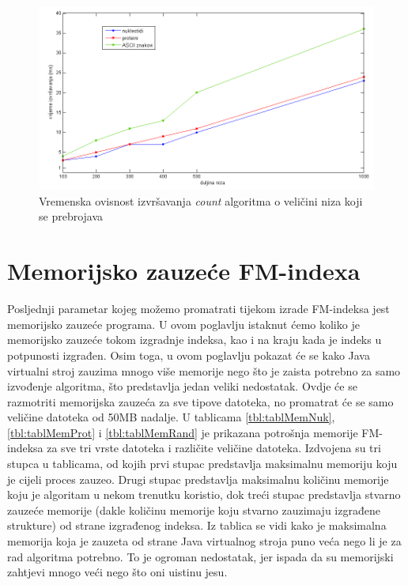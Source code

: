 \begin{figure}[H]
   \centering
       \includegraphics[width=\textwidth]{./pictures/test_count.png}
 \caption{Vremenska ovisnost izvršavanja \emph{count} algoritma o veličini niza koji se prebrojava}
 \label{fig:test_count}
\end{figure}


\section{Memorijsko zauzeće FM-indexa}

Posljednji parametar kojeg možemo promatrati tijekom izrade FM-indeksa jest memorijsko zauzeće programa. U ovom poglavlju istaknut ćemo koliko je memorijsko zauzeće tokom izgradnje indeksa, kao i na kraju kada je indeks u potpunosti izgrađen. Osim toga, u ovom poglavlju pokazat će se kako Java virtualni stroj zauzima mnogo više memorije nego što je zaista potrebno za samo izvođenje algoritma, što predstavlja jedan veliki nedostatak. Ovdje će se razmotriti memorijska zauzeća za sve tipove datoteka, no promatrat će se samo veličine datoteka od 50MB nadalje. U tablicama \ref{tbl:tablMemNuk}, \ref{tbl:tablMemProt} i \ref{tbl:tablMemRand} je prikazana potrošnja memorije FM-indeksa za sve tri vrste datoteka i različite veličine datoteka. Izdvojena su tri stupca u tablicama, od kojih prvi stupac predstavlja maksimalnu memoriju koju je cijeli proces zauzeo. Drugi stupac predstavlja maksimalnu količinu memorije koju je algoritam u nekom trenutku koristio, dok treći stupac predstavlja stvarno zauzeće memorije (dakle količinu memorije koju stvarno zauzimaju izgrađene strukture) od strane izgrađenog indeksa. Iz tablica se vidi kako je maksimalna memorija koja je zauzeta od strane Java virtualnog stroja puno veća nego li je za rad algoritma potrebno. To je ogroman nedostatak, jer ispada da su memorijski zahtjevi mnogo veći nego što oni uistinu jesu.


